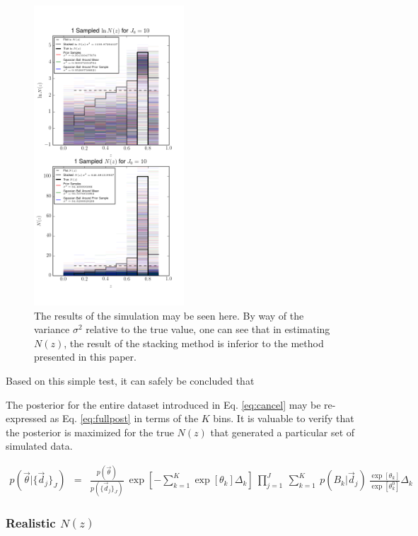 \documentclass[preprint]{aastex}
\begin{document}
\begin{figure}
\includegraphics[width=0.5\textwidth]{toy/samps.png}
\caption{The results of the simulation may be seen here.  By way of the variance $\sigma^{2}$ relative to the true value, one can see that in estimating $N(z)$, the result of the stacking method is inferior to the method presented in this paper.}
\label{fig:dumbestparam}
\end{figure}

Based on this simple test, it can safely be concluded that 

The posterior for the entire dataset introduced in Eq. \ref{eq:cancel} may be re-expressed as Eq. \ref{eq:fullpost} in terms of the $K$ bins.  It is valuable to verify that the posterior is maximized for the true $N(z)$ that generated a particular set of simulated data.

\begin{eqnarray}
\label{eq:fullpost}
p(\vec{\theta}|\{\vec{d}_{j}\}_{J}) &=& \frac{p(\vec{\theta})}{p(\{\vec{d}_{j}\}_{J})}\ \exp\left[-\sum_{k=1}^{K}\exp[\theta_{k}]\Delta_{k}\right]\ \prod_{j=1}^{J}\ \sum_{k=1}^{K}\ p(B_{k}|\vec{d}_{j})\ \frac{\exp[\theta_{k}]}{\exp[\theta_{k}^{0}]}\Delta_{k}
\end{eqnarray}

\subsubsection{Realistic $N(z)$}
\label{sec:realnz}
\end{document}
